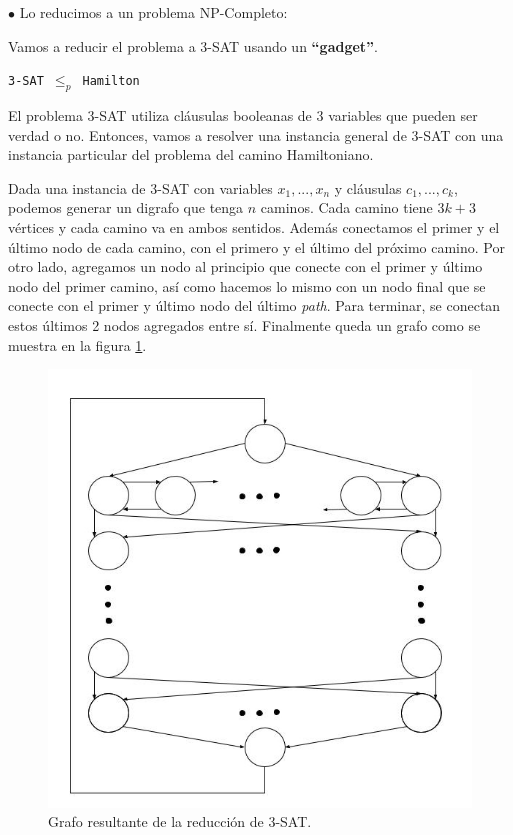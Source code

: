 \documentclass[a4paper,10pt]{article}
\begin{document}
	$\bullet$ Lo reducimos a un problema NP-Completo:

	Vamos a reducir el problema a 3-SAT usando un \textbf{``gadget''}.

	\texttt{3-SAT $\leq_p$ Hamilton}
	\linebreak

	El problema 3-SAT utiliza cláusulas booleanas de 3 variables que pueden ser verdad o no. Entonces, vamos a resolver una instancia general de 3-SAT con una instancia particular del problema del camino Hamiltoniano.

	Dada una instancia de 3-SAT con variables $x_1, ..., x_n$ y cláusulas $c_1, ..., c_k$, podemos generar un digrafo que tenga $n$ caminos. Cada camino tiene $3k+3$ vértices y cada camino va en ambos sentidos. Además conectamos el primer y el último nodo de cada camino, con el primero y el último del próximo camino. Por otro lado, agregamos un nodo al principio que conecte con el primer y último nodo del primer camino, así como hacemos lo mismo con un nodo final que se conecte con el primer y último nodo del último \textit{path}. Para terminar, se conectan estos últimos 2 nodos agregados entre sí. Finalmente queda un grafo como se muestra en la figura \ref{fig:punto-3-1}.

	\begin{figure}[!htb]
		\centering
		\includegraphics[scale=0.35]{images/grafo-3-1.jpg}
		\caption{Grafo resultante de la reducción de 3-SAT.}
		\label{fig:punto-3-1}
	\end{figure}
\end{document}
